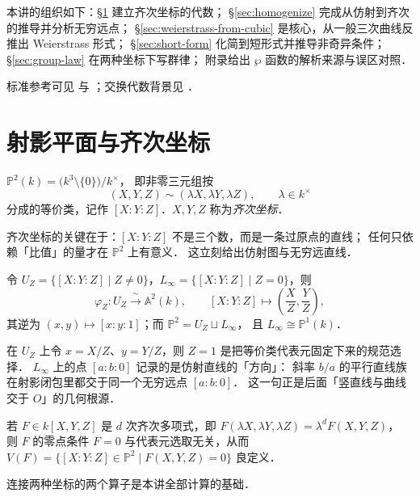 \documentclass[10pt,a4paper]{article}
\numberwithin{equation}{section}
\begin{document}
本讲的组织如下：\S\ref{sec:proj} 建立齐次坐标的代数；
\S\ref{sec:homogenize} 完成从仿射到齐次的推导并分析无穷远点；
\S\ref{sec:weierstrass-from-cubic} 是核心，从一般三次曲线反推出 Weierstrass 形式；
\S\ref{sec:short-form} 化简到短形式并推导非奇异条件；
\S\ref{sec:group-law} 在两种坐标下写群律；
附录给出 $\wp$ 函数的解析来源与误区对照．

标准参考可见 \cite{Hartshorne1977} 与 \cite{VakilRisingSea}；交换代数背景见 \cite{Eisenbud1995Commutative}．

\section{射影平面与齐次坐标}\label{sec:proj}

\begin{definition}[射影平面]
$\mathbb P^{2}(k)=\bigl(k^{3}\setminus\{0\}\bigr)/k^{\times}$，
即非零三元组按
\[(X,Y,Z)\sim(\lambda X,\lambda Y,\lambda Z),\qquad \lambda\in k^{\times}\]
分成的等价类，记作 $[X:Y:Z]$．$X,Y,Z$ 称为\emph{齐次坐标}．
\end{definition}

齐次坐标的关键在于：$[X:Y:Z]$ 不是三个数，而是一条过原点的直线；
任何只依赖「比值」的量才在 $\mathbb P^{2}$ 上有意义．
这立刻给出仿射图与无穷远直线．

\begin{definition}[标准仿射图与无穷远直线]
令 $U_{Z}=\{[X:Y:Z]\mid Z\neq 0\}$，$L_{\infty}=\{[X:Y:Z]\mid Z=0\}$，则
\[
\varphi_{Z}:U_{Z}\xrightarrow{\ \sim\ }\mathbb A^{2}(k),\qquad
[X:Y:Z]\longmapsto \left(\frac{X}{Z},\frac{Y}{Z}\right),
\]
其逆为 $(x,y)\mapsto[x:y:1]$；而 $\mathbb P^{2}=U_{Z}\sqcup L_{\infty}$，
且 $L_{\infty}\cong\mathbb P^{1}(k)$．
\end{definition}

在 $U_{Z}$ 上令 $x=X/Z$、$y=Y/Z$，则 $Z=1$ 是把等价类代表元固定下来的规范选择．
$L_{\infty}$ 上的点 $[a:b:0]$ 记录的是仿射直线的「方向」：
斜率 $b/a$ 的平行直线族在射影闭包里都交于同一个无穷远点 $[a:b:0]$．
这一句正是后面「竖直线与曲线交于 $O$」的几何根源．

\begin{definition}[齐次多项式与射影曲线]
若 $F\in k[X,Y,Z]$ 是 $d$ 次齐次多项式，即
$F(\lambda X,\lambda Y,\lambda Z)=\lambda^{d}F(X,Y,Z)$，
则 $F$ 的零点条件 $F=0$ 与代表元选取无关，从而
$V(F)=\{[X:Y:Z]\in\mathbb P^{2}\mid F(X,Y,Z)=0\}$ 良定义．
\end{definition}

连接两种坐标的两个算子是本讲全部计算的基础．
\end{document}
